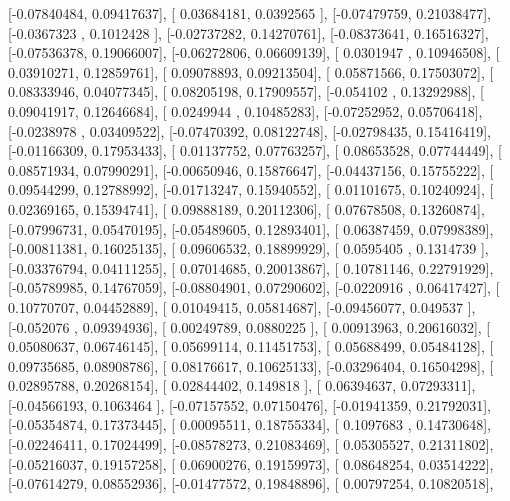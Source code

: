 \documentclass{article}
\begin{document}
       [-0.07840484,  0.09417637],
       [ 0.03684181,  0.0392565 ],
       [-0.07479759,  0.21038477],
       [-0.0367323 ,  0.1012428 ],
       [-0.02737282,  0.14270761],
       [-0.08373641,  0.16516327],
       [-0.07536378,  0.19066007],
       [-0.06272806,  0.06609139],
       [ 0.0301947 ,  0.10946508],
       [ 0.03910271,  0.12859761],
       [ 0.09078893,  0.09213504],
       [ 0.05871566,  0.17503072],
       [ 0.08333946,  0.04077345],
       [ 0.08205198,  0.17909557],
       [-0.054102  ,  0.13292988],
       [ 0.09041917,  0.12646684],
       [ 0.0249944 ,  0.10485283],
       [-0.07252952,  0.05706418],
       [-0.0238978 ,  0.03409522],
       [-0.07470392,  0.08122748],
       [-0.02798435,  0.15416419],
       [-0.01166309,  0.17953433],
       [ 0.01137752,  0.07763257],
       [ 0.08653528,  0.07744449],
       [ 0.08571934,  0.07990291],
       [-0.00650946,  0.15876647],
       [-0.04437156,  0.15755222],
       [ 0.09544299,  0.12788992],
       [-0.01713247,  0.15940552],
       [ 0.01101675,  0.10240924],
       [ 0.02369165,  0.15394741],
       [ 0.09888189,  0.20112306],
       [ 0.07678508,  0.13260874],
       [-0.07996731,  0.05470195],
       [-0.05489605,  0.12893401],
       [ 0.06387459,  0.07998389],
       [-0.00811381,  0.16025135],
       [ 0.09606532,  0.18899929],
       [ 0.0595405 ,  0.1314739 ],
       [-0.03376794,  0.04111255],
       [ 0.07014685,  0.20013867],
       [ 0.10781146,  0.22791929],
       [-0.05789985,  0.14767059],
       [-0.08804901,  0.07290602],
       [-0.0220916 ,  0.06417427],
       [ 0.10770707,  0.04452889],
       [ 0.01049415,  0.05814687],
       [-0.09456077,  0.049537  ],
       [-0.052076  ,  0.09394936],
       [ 0.00249789,  0.0880225 ],
       [ 0.00913963,  0.20616032],
       [ 0.05080637,  0.06746145],
       [ 0.05699114,  0.11451753],
       [ 0.05688499,  0.05484128],
       [ 0.09735685,  0.08908786],
       [ 0.08176617,  0.10625133],
       [-0.03296404,  0.16504298],
       [ 0.02895788,  0.20268154],
       [ 0.02844402,  0.149818  ],
       [ 0.06394637,  0.07293311],
       [-0.04566193,  0.1063464 ],
       [-0.07157552,  0.07150476],
       [-0.01941359,  0.21792031],
       [-0.05354874,  0.17373445],
       [ 0.00095511,  0.18755334],
       [ 0.1097683 ,  0.14730648],
       [-0.02246411,  0.17024499],
       [-0.08578273,  0.21083469],
       [ 0.05305527,  0.21311802],
       [-0.05216037,  0.19157258],
       [ 0.06900276,  0.19159973],
       [ 0.08648254,  0.03514222],
       [-0.07614279,  0.08552936],
       [-0.01477572,  0.19848896],
       [ 0.00797254,  0.10820518],
\end{document}
